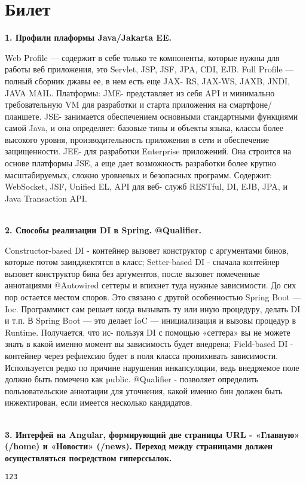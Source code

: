 \documentclass{article}
\newcommand{\bil}[5]{%
        \section{Билет}
        \textbf{1. #1}

        #4
        \\
        \textbf{2. #2}
        
        #5
        \\
        \textbf{3. #3}
}
\begin{document}
\bil{Профили плаформы Java/Jakarta EE.}{Способы реализации DI в Spring. @Qualifier.}
{Интерфей на Angular, формирующий две страницы URL - «Главную» (/home) и «Новости» (/news). Переход между страницами должен осуществляться посредством гиперссылок.}{
    Web Profile — содержит в себе только те компоненты, которые нужны для работы веб приложения, это Servlet, JSP, JSF, JPA, CDI, EJB. Full Profile — полный сборник джавы ее, в нем есть еще JAX- RS, JAX-WS, JAXB, JNDI, JAVA MAIL. 
    Платформы: JME- представляет из себя API и минимально требовательную VM для разработки и старта приложения на смартфоне/планшете. 
    JSE- занимается обеспечением основными стандартными функциями самой Java, и она определяет: базовые типы и объекты языка, классы более высокого уровня, производительность приложения в сети и обеспечение защищенности. 
    JEE- для разработки Enterprise приложений. Она строится на основе платформы JSE, а еще дает возможность разработки более крупно масштабируемых, сложно уровневых и безопасных программ. 
    Содержит: WebSocket, JSF, Unified EL, API для веб- служб RESTful, DI, EJB, JPA, и Java Transaction API.
}{
    Constructor-based DI - контейнер вызовет конструктор с аргументами бинов, которые потом заинджектятся в класс; 
    Setter-based DI - сначала контейнер вызовет конструктор бина без аргументов, после вызовет помеченные аннотациями @Autowired сеттеры и впихнет туда нужные зависимости. 
    До сих пор остается местом споров. 
    Это связано с другой особенностью Spring Boot — Ioc. 
    Программист сам решает когда вызывать ту или иную процедуру, делать DI и т.п. 
    В Spring Boot — это делает IoC — инициализация и вызовы процедур в Runtime. 
    Получается, что ис- пользуя DI с помощью «сеттера» вы не можете знать в какой именно момент вы зависимость будет внедрена; Field-based DI - контейнер через рефлексию будет в поля класса пропихивать зависимости. 
    Используется редко по причине нарушения инкапсуляции, ведь внедряемое поле должно быть помечено как public.
    @Qualifier - позволяет определить пользовательские аннотации для уточнения, какой именно бин должен быть инжектирован, если имеется несколько кандидатов.
}
\begin{lstlisting}[frame=single, basicstyle=\ttfamily, breaklines=true, breakatwhitespace=true, postbreak=\mbox{\textcolor{red}{$\hookrightarrow$}\space}]
123
\end{lstlisting}
\end{document}
